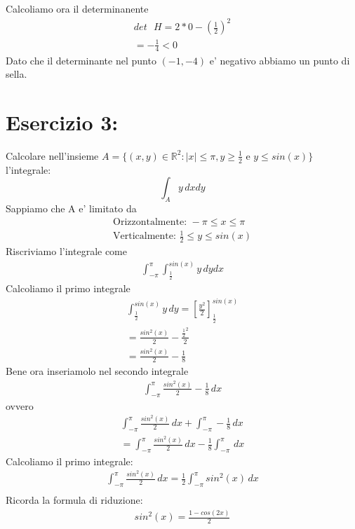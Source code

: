 \documentclass{article}
\begin{document}
Calcoliamo ora il determinanente
\begin{align*}
    \text{$det$ $H$}= 2 * 0 - (\frac{1}{2})^2\\
    = -\frac{1}{4} <0
\end{align*}
Dato che il determinante nel punto $(-1,-4)$ e' negativo abbiamo un punto di sella.

\pagebreak
\section*{Esercizio 3:}
Calcolare nell'insieme $A=\{(x,y) \in \mathbb{R}^2 : |x|\leq\pi , y \geq \frac{1}{2} \text{ e } y\leq sin(x)\}$ l'integrale:
\begin{equation*}
    \int_A y \,dxdy
\end{equation*}
Sappiamo che A e' limitato da
\begin{align*}
   \text{Orizzontalmente: } -\pi \leq x \leq \pi \\
    \text{Verticalmente: } \frac{1}{2}\leq y \leq sin(x) 
\end{align*}
Riscriviamo l'integrale come
\begin{align*}
    \int_{-\pi}^\pi \int_{\frac{1}{2}}^{sin(x)} y \,dydx
\end{align*}
Calcoliamo il primo integrale
\begin{align*}
    \int_{\frac{1}{2}}^{sin(x)} y \,dy=[\frac{y^2}{2}]_{\frac{1}{2}}^{sin(x)} \\
    = \frac{sin^2(x)}{2}-\frac{\frac{1}{2}^2}{2} \\
    = \frac{sin^2(x)}{2}-\frac{1}{8}
\end{align*}
Bene ora inseriamolo nel secondo integrale
\begin{align*}
    \int_{-\pi}^{\pi} \frac{sin^2(x)}{2}-\frac{1}{8} \,dx
\end{align*}
ovvero
\begin{align*}
    \int_{-\pi}^{\pi} \frac{sin^2(x)}{2} \,dx + \int_{-\pi}^{\pi} -\frac{1}{8} \,dx \\
    = \int_{-\pi}^{\pi} \frac{sin^2(x)}{2} \,dx -\frac{1}{8} \int_{-\pi}^{\pi}  \,dx
\end{align*}
Calcoliamo il primo integrale:
\begin{align*}
    \int_{-\pi}^{\pi} \frac{sin^2(x)}{2} \,dx= \frac{1}{2}\int_{-\pi}^{\pi} sin^2(x) \,dx \\
\end{align*}
Ricorda la formula di riduzione:
\begin{align*}
    sin^2(x)=\frac{1-cos(2x)}{2}
\end{align*}
\end{document}
